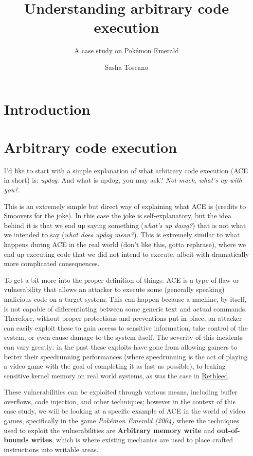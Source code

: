 \documentclass[a4paper]{usiinfbachelorproject}
\author{Sasha Toscano}
\title{\textbf{Understanding arbitrary code
execution}}
\subtitle{A case study on Pokémon Emerald}
\begin{document}
\maketitle
\tableofcontents\newpage

\section{\textbf{Introduction}}

\section{\textbf{Arbitrary code execution}}
I'd like to start with a simple explanation of what arbitrary code execution (ACE in short) is: \textit{updog}. And what is updog, you may ask? \textit{Not much, what's up with you?}.

This is an extremely simple but direct way of explaining what ACE is (credits to \href{https://www.youtube.com/watch?v=-XmXYCXX7y4}{Smoovers} for the joke). In this case the joke is self-explanatory, but the idea behind it is that we end up saying something (\textit{what's up dawg?}) that is not what we intended to say (\textit{what does updog mean?}). This is extremely similar to what happens during ACE in the real world (don't like this, gotta rephrase), where we end up executing code that we did not intend to execute, albeit with dramatically more complicated consequences.

To get a bit more into the proper definition of things: ACE is a type of flaw or vulnerability that allows an attacker to execute some (generally speaking) malicious code on a target system. This can happen because a machine, by itself, is not capable of differentiating between some generic text and actual commands. Therefore, without proper protections and preventions put in place, an attacker can easily exploit these to gain access to sensitive information, take control of the system, or even cause damage to the system itself. The severity of this incidents can vary greatly: in the past these exploits have gone from allowing gamers to better their speedrunning performances (where speedrunning is the act of playing a video game with the goal of completing it as fast as possible), to leaking sensitive kernel memory on real world systems, as was the case in \href{https://comsec.ethz.ch/research/microarch/retbleed/}{Retbleed}.

These vulnerabilities can be exploited through various means, including buffer overflows, code injection, and other techniques; however in the context of this case study, we will be looking at a specific example of ACE in the world of video games, specifically in the game \textit{Pokémon Emerald (2004)} where the techniques used to exploit the vulnerabilities are \textbf{Arbitrary memory write} and \textbf{out-of-bounds writes}, which is where existing mechanics are used to place crafted instructions into writable areas.
\end{document}
